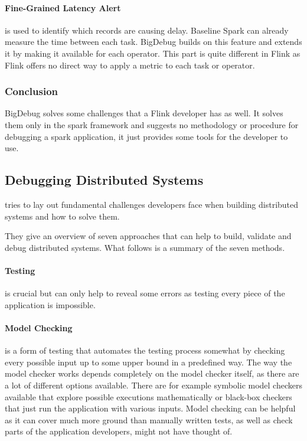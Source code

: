 \paragraph{Fine-Grained Latency Alert} is used to identify which records are causing delay. Baseline Spark can already measure the time between each task. BigDebug builds on this feature and extends it by making it available for each operator. This part is quite different in Flink as Flink offers no direct way to apply a metric to each task or operator.

\subsubsection{Conclusion}
BigDebug solves some challenges that a Flink developer has as well. It solves them only in the spark framework and suggests no methodology or procedure for debugging a spark application, it just provides some tools for the developer to use.

\pagebreak

\subsection{Debugging Distributed Systems}
\label{debuggingDistributedSystems}

\cite{Beschastnikh:2016:DDS:2927299.2940294} tries to lay out fundamental challenges developers face when building distributed systems and how to solve them.

They give an overview of seven approaches that can help to build, validate and debug distributed systems. What follows is a summary of the seven methods.

\paragraph{Testing} is crucial but can only help to reveal some errors as testing every piece of the application is impossible.

\paragraph{Model Checking} is a form of testing that automates the testing process somewhat by checking every possible input up to some upper bound in a predefined way. The way the model checker works depends completely on the model checker itself, as there are a lot of different options available. There are for example symbolic model checkers available that explore possible executions mathematically or black-box checkers that just run the application with various inputs. Model checking can be helpful as it can cover much more ground than manually written tests, as well as check parts of the application developers, might not have thought of.

